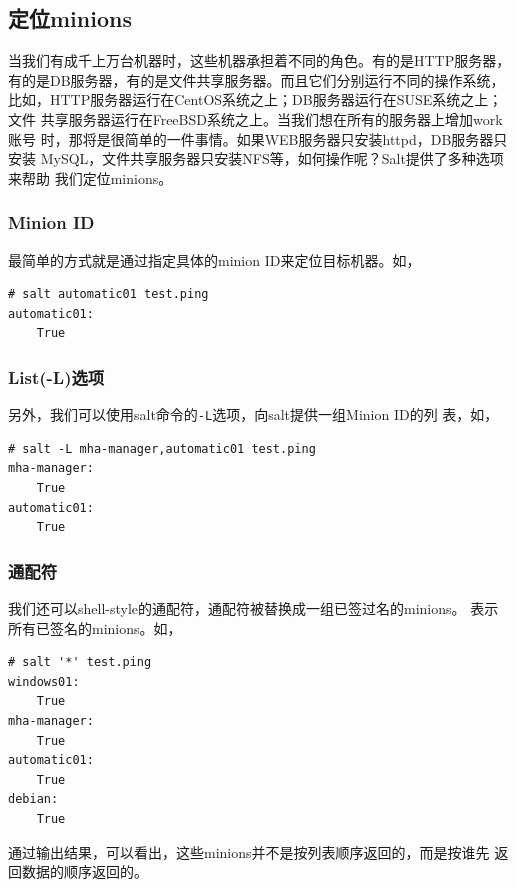 \subsection{定位minions}
\label{sec:minionTargeting}

当我们有成千上万台机器时，这些机器承担着不同的角色。有的是HTTP服务器，
有的是DB服务器，有的是文件共享服务器。而且它们分别运行不同的操作系统，
比如，HTTP服务器运行在CentOS系统之上；DB服务器运行在SUSE系统之上；文件
共享服务器运行在FreeBSD系统之上。当我们想在所有的服务器上增加work账号
时，那将是很简单的一件事情。如果WEB服务器只安装httpd，DB服务器只安装
MySQL，文件共享服务器只安装NFS等，如何操作呢？Salt提供了多种选项来帮助
我们定位minions。

\subsubsection*{Minion ID}

最简单的方式就是通过指定具体的minion ID来定位目标机器。如，

\begin{verbatim}
# salt automatic01 test.ping
automatic01:
    True
\end{verbatim}

\subsubsection*{List(-L)选项}

另外，我们可以使用salt命令的\verb|-L|选项，向salt提供一组Minion ID的列
表，如，

\begin{verbatim}
# salt -L mha-manager,automatic01 test.ping
mha-manager:
    True
automatic01:
    True
\end{verbatim}

\subsubsection*{通配符\*}

我们还可以shell-style的通配符，通配符被替换成一组已签过名的minions。\*
表示所有已签名的minions。如，

\begin{verbatim}
# salt '*' test.ping
windows01:
    True
mha-manager:
    True
automatic01:
    True
debian:
    True
\end{verbatim}

通过输出结果，可以看出，这些minions并不是按列表顺序返回的，而是按谁先
返回数据的顺序返回的。

